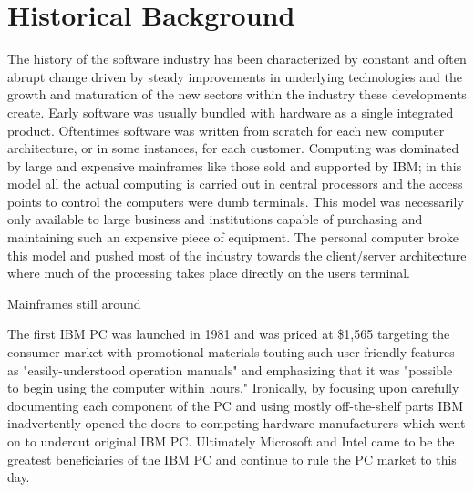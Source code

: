 \section*{Historical Background}

The history of the software industry has been characterized by constant and often abrupt change driven by steady improvements in underlying technologies and the growth and maturation of the new sectors within the industry these developments create. Early software was usually bundled with hardware as a single integrated product.\autocite[4]{buxmann2012software}
Oftentimes software was written from scratch for each new computer architecture, or in some instances, for each customer.\autocite{MainframesStillAround}
Computing was dominated by large and expensive mainframes like those sold and supported by IBM; in this model all the actual computing is carried out in central processors and the access points to control the computers were dumb terminals.\autocite[]{LargeParadigmShiftCloudComputing}
This model was necessarily only available to large business and institutions capable of purchasing and maintaining such an expensive piece of equipment.
The personal computer broke this model and pushed most of the industry towards the client/server architecture where much of the processing takes place directly on the users terminal.\autocite[]{LargeParadigmShiftCloudComputing}

Mainframes still around\autocite{MainframesStillAround}

The first IBM PC was launched in 1981 and was priced at \$1,565 targeting the consumer market with promotional materials touting such user friendly features as "easily-understood operation manuals" and emphasizing that it was "possible to begin using the computer within hours."\autocite{PCBirthday}
Ironically, by focusing upon carefully documenting each component of the PC and using mostly off-the-shelf parts IBM inadvertently opened the doors to competing hardware manufacturers which went on to undercut original IBM PC.\autocite{PCBirthday}
Ultimately Microsoft and Intel came to be the greatest beneficiaries of the IBM PC and continue to rule the PC market to this day.\autocite{PCBirthday}

